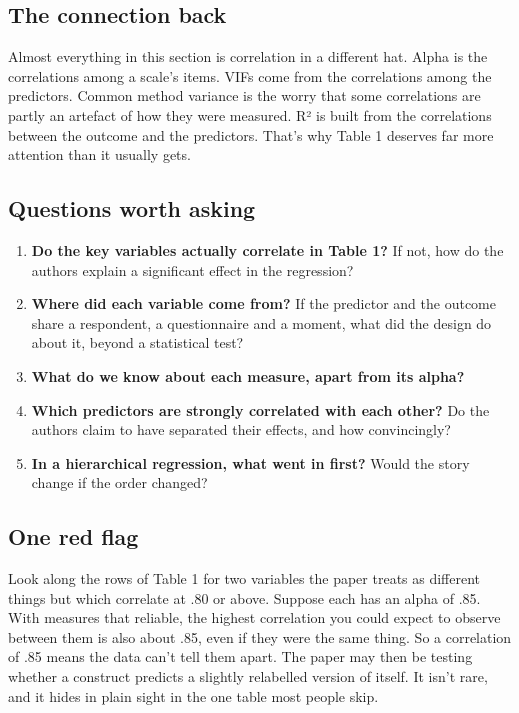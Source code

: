 \documentclass[
]{book}
\providecommand{\tightlist}{%
  \setlength{\itemsep}{0pt}\setlength{\parskip}{0pt}}
\begin{document}
\subsection{The connection back}\label{the-connection-back-3}

Almost everything in this section is correlation in a different hat. Alpha is the correlations among a scale's items. VIFs come from the correlations among the predictors. Common method variance is the worry that some correlations are partly an artefact of how they were measured. R² is built from the correlations between the outcome and the predictors. That's why Table 1 deserves far more attention than it usually gets.

\subsection{Questions worth asking}\label{questions-worth-asking-3}

\begin{enumerate}
\def\labelenumi{\arabic{enumi}.}
\tightlist
\item
  \textbf{Do the key variables actually correlate in Table 1?} If not, how do the authors explain a significant effect in the regression?
\item
  \textbf{Where did each variable come from?} If the predictor and the outcome share a respondent, a questionnaire and a moment, what did the design do about it, beyond a statistical test?
\item
  \textbf{What do we know about each measure, apart from its alpha?}
\item
  \textbf{Which predictors are strongly correlated with each other?} Do the authors claim to have separated their effects, and how convincingly?
\item
  \textbf{In a hierarchical regression, what went in first?} Would the story change if the order changed?
\end{enumerate}

\subsection{One red flag}\label{one-red-flag-3}

Look along the rows of Table 1 for two variables the paper treats as different things but which correlate at .80 or above. Suppose each has an alpha of .85. With measures that reliable, the highest correlation you could expect to observe between them is also about .85, even if they were the same thing. So a correlation of .85 means the data can't tell them apart. The paper may then be testing whether a construct predicts a slightly relabelled version of itself. It isn't rare, and it hides in plain sight in the one table most people skip.
\end{document}
